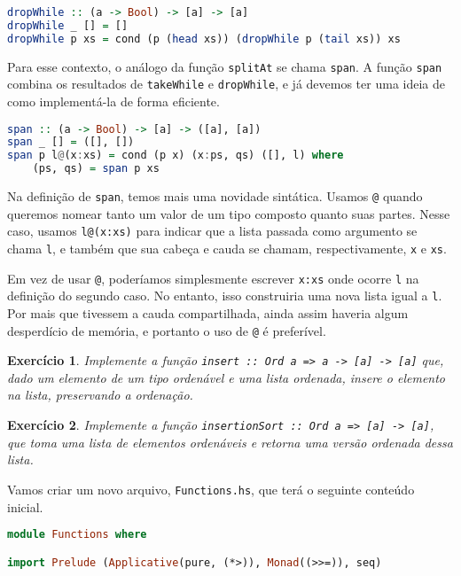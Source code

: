 \documentclass[a4paper]{article}
\newtheorem{exercicio}{Exercício}
\begin{document}
\begin{lstlisting}[language=haskell, frame=single]
dropWhile :: (a -> Bool) -> [a] -> [a]
dropWhile _ [] = []
dropWhile p xs = cond (p (head xs)) (dropWhile p (tail xs)) xs
\end{lstlisting}

Para esse contexto, o análogo da função \texttt{splitAt} se chama \texttt{span}.
A função \texttt{span} combina os resultados de \texttt{takeWhile} e \texttt{dropWhile}, e já devemos ter uma ideia de como implementá-la de forma eficiente.

\begin{lstlisting}[language=haskell, frame=single]
span :: (a -> Bool) -> [a] -> ([a], [a])
span _ [] = ([], [])
span p l@(x:xs) = cond (p x) (x:ps, qs) ([], l) where
	(ps, qs) = span p xs
\end{lstlisting}

Na definição de \texttt{span}, temos mais uma novidade sintática.
Usamos \texttt{@} quando queremos nomear tanto um valor de um tipo composto quanto suas partes.
Nesse caso, usamos \texttt{l@(x:xs)} para indicar que a lista passada como argumento se chama \texttt{l}, e também que sua cabeça e cauda se chamam, respectivamente, \texttt{x} e \texttt{xs}.

Em vez de usar \texttt{@}, poderíamos simplesmente escrever \texttt{x:xs} onde ocorre \texttt{l} na definição do segundo caso.
No entanto, isso construiria uma nova lista igual a \texttt{l}.
Por mais que tivessem a cauda compartilhada, ainda assim haveria algum desperdício de memória, e portanto o uso de \texttt{@} é preferível.

\begin{exercicio}
	Implemente a função \emph{\texttt{insert :: Ord a => a -> [a] -> [a]}} que, dado um elemento de um tipo ordenável e uma lista ordenada, insere o elemento na lista, preservando a ordenação.
\end{exercicio}

\begin{exercicio}
	Implemente a função \emph{\texttt{insertionSort :: Ord a => [a] -> [a]}}, que toma uma lista de elementos ordenáveis e retorna uma versão ordenada dessa lista.
\end{exercicio}

Vamos criar um novo arquivo, \texttt{Functions.hs}, que terá o seguinte conteúdo inicial.

\begin{lstlisting}[language=haskell, frame=single]
module Functions where

import Prelude (Applicative(pure, (*>)), Monad((>>=)), seq)
\end{lstlisting}
\end{document}
